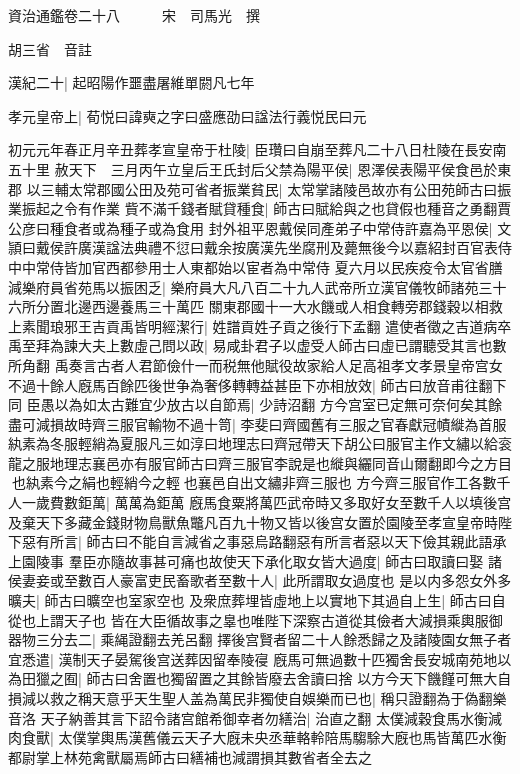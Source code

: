資治通鑑卷二十八　　　宋　司馬光　撰

胡三省　音註

漢紀二十|{
	起昭陽作噩盡屠維單閼凡七年}


孝元皇帝上|{
	荀悦曰諱奭之字曰盛應劭曰諡法行義悦民曰元}


初元元年春正月辛丑葬孝宣皇帝于杜陵|{
	臣瓚曰自崩至葬凡二十八日杜陵在長安南五十里}
赦天下　三月丙午立皇后王氏封后父禁為陽平侯|{
	恩澤侯表陽平侯食邑於東郡}
以三輔太常郡國公田及苑可省者振業貧民|{
	太常掌諸陵邑故亦有公田苑師古曰振業振起之令有作業}
貲不滿千錢者賦貸種食|{
	師古曰賦給與之也貸假也種音之勇翻賈公彦曰種食者或為種子或為食用}
封外祖平恩戴侯同產弟子中常侍許嘉為平恩侯|{
	文頴曰戴侯許廣漢諡法典禮不愆曰戴余按廣漢先坐腐刑及薨無後今以嘉紹封百官表侍中中常侍皆加官西都參用士人東都始以宦者為中常侍}
夏六月以民疾疫令太官省膳減樂府員省苑馬以振困乏|{
	樂府員大凡八百二十九人武帝所立漢官儀牧師諸苑三十六所分置北邊西邊養馬三十萬匹}
關東郡國十一大水饑或人相食轉旁郡錢穀以相救　上素聞琅邪王吉貢禹皆明經潔行|{
	姓譜貢姓子貢之後行下孟翻}
遣使者徵之吉道病卒禹至拜為諫大夫上數虛己問以政|{
	易咸卦君子以虚受人師古曰虛已謂聽受其言也數所角翻}
禹奏言古者人君節儉什一而税無他賦役故家給人足高祖孝文孝景皇帝宫女不過十餘人廐馬百餘匹後世争為奢侈轉轉益甚臣下亦相放效|{
	師古曰放音甫往翻下同}
臣愚以為如太古難宜少放古以自節焉|{
	少詩沼翻}
方今宫室已定無可奈何矣其餘盡可減損故時齊三服官輸物不過十笥|{
	李斐曰齊國舊有三服之官春獻冠幘縰為首服紈素為冬服輕綃為夏服凡三如淳曰地理志曰齊冠帶天下胡公曰服官主作文繡以給衮龍之服地理志襄邑亦有服官師古曰齊三服官李說是也縰與纚同音山爾翻即今之方目也紈素今之絹也輕綃今之輕也襄邑自出文繡非齊三服也}
方今齊三服官作工各數千人一歲費數鉅萬|{
	萬萬為鉅萬}
廐馬食粟將萬匹武帝時又多取好女至數千人以填後宫及棄天下多藏金錢財物鳥獸魚鼈凡百九十物又皆以後宫女置於園陵至孝宣皇帝時陛下惡有所言|{
	師古曰不能自言減省之事惡烏路翻惡有所言者惡以天下儉其親此語承上園陵事}
羣臣亦隨故事甚可痛也故使天下承化取女皆大過度|{
	師古曰取讀曰娶}
諸侯妻妾或至數百人豪富吏民畜歌者至數十人|{
	此所謂取女過度也}
是以内多怨女外多曠夫|{
	師古曰曠空也室家空也}
及衆庶葬埋皆虛地上以實地下其過自上生|{
	師古曰自從也上謂天子也}
皆在大臣循故事之辠也唯陛下深察古道從其儉者大減損乘輿服御器物三分去二|{
	乘䋲證翻去羌呂翻}
擇後宫賢者留二十人餘悉歸之及諸陵園女無子者宜悉遣|{
	漢制天子晏駕後宫送葬因留奉陵寑}
廐馬可無過數十匹獨舍長安城南苑地以為田獵之囿|{
	師古曰舍置也獨留置之其餘皆廢去舍讀曰捨}
以方今天下饑饉可無大自損減以救之稱天意乎天生聖人盖為萬民非獨使自娛樂而已也|{
	稱只證翻為于偽翻樂音洛}
天子納善其言下詔令諸宫館希御幸者勿繕治|{
	治直之翻}
太僕減穀食馬水衡減肉食獸|{
	太僕掌輿馬漢舊儀云天子大廐未央丞華輅軨陪馬騶駼大廐也馬皆萬匹水衡都尉掌上林苑禽獸屬焉師古曰繕補也減謂損其數省者全去之}


